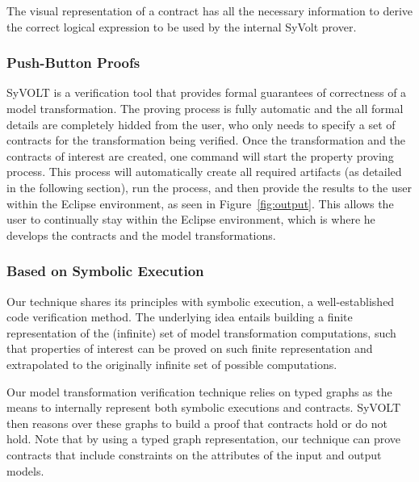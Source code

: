 The visual representation of a contract has all the necessary information to
derive the correct logical expression to be used by the internal SyVolt prover.

\subsubsection{Push-Button Proofs}
\label{sec:push_button_proofs}

SyVOLT is a verification tool that provides formal guarantees of correctness of
a model transformation. The
proving process is fully automatic and the all formal details are completely
hidded from the user, who only needs to specify a set of contracts for the
transformation being verified. Once the transformation and the contracts of
interest are created, one command will start the property proving process. This
process will automatically create all required artifacts (as detailed in the
following section), run the process, and then provide the results to the user
within the Eclipse environment, as seen in Figure~\ref{fig:output}. This allows
the user to continually stay within the Eclipse environment, which is where he
develops the contracts and the model transformations.


\subsubsection{Based on Symbolic Execution}

Our technique shares its principles with
symbolic execution, a well-established code verification method.
The underlying idea entails building a finite representation of the (infinite)
set of model transformation computations, such that properties of interest can
be proved on
such finite representation and extrapolated to the originally infinite set of possible
computations.

Our model transformation verification technique relies on typed graphs as the
means to internally represent both symbolic executions and contracts. SyVOLT
then reasons over these graphs to build a proof that contracts hold or do not
hold. Note that by using a typed graph representation, our technique can prove
contracts that include constraints on the attributes of the input and output
models. 

